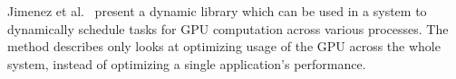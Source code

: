 \documentclass[journal]{IEEEtran}
\begin{document}
Jimenez et al.~\cite{Jimenez2009} present a dynamic library which can be used
in a system to dynamically schedule tasks for GPU computation across various
processes. The method describes only looks at optimizing usage of the GPU across
the whole system, instead of optimizing a single application's performance.

%
%



%
%
\end{document}
